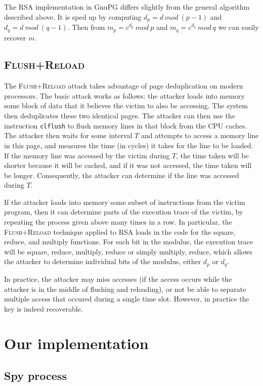 \documentclass[11pt]{llncs}
\newcommand{\flushreload}{\textsc{Flush}+\textsc{Reload}}
\begin{document}
The RSA implementation in GnuPG differs slightly from the general algorithm
described above. It is sped up by computing $d_p = d\ mod\ (p-1)$ and $d_q = d\
mod\ (q-1)$. Then from $m_p = c^{d_p}\ mod\ p$ and $m_q = c^{d_q}\ mod\ q$ we
can easily recover $m$.

\subsection{\flushreload{}}

The \flushreload{} attack takes advantage of page deduplication on modern
processors. The basic attack works as follows: the attacker loads into memory
some block of data that it believes the victim to also be accessing. The system
then deduplicates these two identical pages. The attacker can then use the
instruction \texttt{clflush} to flush memory lines in that block from the CPU
caches. The attacker then waits for some interval $T$ and attempts to access a
memory line in this page, and measures the time (in cycles) it takes for the
line to be loaded. If the memory line was accessed by the victim during $T$, the
time taken will be shorter because it will be cached, and if it was not
accessed, the time taken will be longer.  Consequently, the attacker can
determine if the line was accessed during $T$.

If the attacker loads into memory some subset of instructions from the victim
program, then it can determine parts of the execution trace of the victim, by
repeating the process given above many times in a row. In particular, the
\flushreload{} technique applied to RSA loads in the code for the square,
reduce, and multiply functions. For each bit in the modulus, the execution trace
will be square, reduce, multiply, reduce or simply multiply, reduce, which
allows the attacker to determine individual bits of the modulus, either $d_p$ or
$d_q$.

In practice, the attacker may miss accesses (if the access occurs while the
attacker is in the middle of flushing and reloading), or not be able to separate
multiple access that occured during a single time slot. However, in practice the
key is indeed recoverable.

\section{Our implementation}

\subsection{Spy process}
\end{document}

